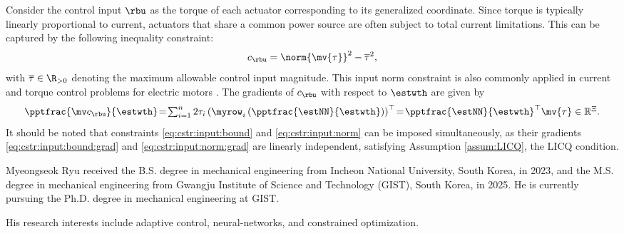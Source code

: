 \documentclass[lettersize,journal]{IEEEtran}
\newcommand*{\template}{template}
\begin{document}
Consider the control input $\rbu$ as the torque of each actuator corresponding to its generalized coordinate. Since torque is typically linearly proportional to current, actuators that share a common power source are often subject to total current limitations. This can be captured by the following inequality constraint: 
\begin{equation}
    c_{\rbu}
    =
    \norm{
        \mv{\tau}
    }^2 
    -
    \overline\tau^2
    ,
    \label{eq:cstr:input:norm}
\end{equation}
with $\overline\tau\in\R_{>0}$ denoting the maximum allowable control input magnitude. This input norm constraint is also commonly applied in current and torque control problems for electric motors \cite{Choi:2024aa}.
The gradients of $c_{\rbu}$ with respect to $\estwth$ are given by
\begin{equation}
    \pptfrac{\mv c_{\rbu}}{\estwth}
    \!=\! 
    \textstyle\sum_{i=1}^n 2\tau_{i} 
    \left(
        \myrow_i
        \left(
            \pptfrac{\estNN}{\estwth}
        \right)
    \right)^\top  
    \!=\! 
    {\pptfrac{\estNN}{\estwth}}^\top
    \mv{\tau}
    \in \mathbb R^{\Xi}.
    \label{eq:cstr:input:norm:grad}
\end{equation}
It should be noted that constraints \eqref{eq:cstr:input:bound} and \eqref{eq:cstr:input:norm} can be imposed simultaneously, as their gradients \eqref{eq:cstr:input:bound:grad} and \eqref{eq:cstr:input:norm:grad} are linearly independent, satisfying Assumption \ref{assum:LICQ}, \ie the LICQ condition.

\printbibliography


\begin{IEEEbiography}{Myeongseok Ryu}
    received the B.S. degree in mechanical engineering from Incheon National University, South Korea, in 2023, and the M.S. degree in mechanical engineering from Gwangju Institute of Science and Technology (GIST), South Korea, in 2025. 
    He is currently pursuing the Ph.D. degree in mechanical engineering at GIST.

    His research interests include adaptive control, neural-networks, and constrained optimization.
\end{IEEEbiography}
\end{document}
